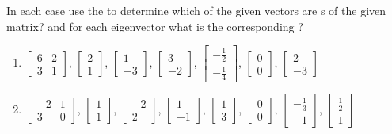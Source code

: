 \begin{exercise}
In each case use the  to determine which of the given vectors are s of the given matrix? and for each eigenvector what is the corresponding ?
\begin{enumerate}
\item \(\begin{bmatrix} 6&2\\3&1 \end{bmatrix}\),\quad
\(\begin{bmatrix}2\\1\end{bmatrix}\), \(\begin{bmatrix}1\\-3\end{bmatrix}\), \(\begin{bmatrix}3\\-2\end{bmatrix}\), \(\begin{bmatrix}-\frac12\\-\frac14\end{bmatrix}\), \(\begin{bmatrix}0\\0\end{bmatrix}\), \(\begin{bmatrix}2\\-3\end{bmatrix}\)

\item \(\begin{bmatrix} -2&1\\3&0 \end{bmatrix}\),\quad
\(\begin{bmatrix}1\\1\end{bmatrix}\), \(\begin{bmatrix}-2\\2\end{bmatrix}\), \(\begin{bmatrix}1\\-1\end{bmatrix}\), \(\begin{bmatrix}1\\3\end{bmatrix}\), \(\begin{bmatrix}0\\0\end{bmatrix}\), \(\begin{bmatrix}-\frac13\\-1\end{bmatrix}\), \(\begin{bmatrix}\frac12\\1\end{bmatrix}\)


\end{enumerate}
\end{exercise}

